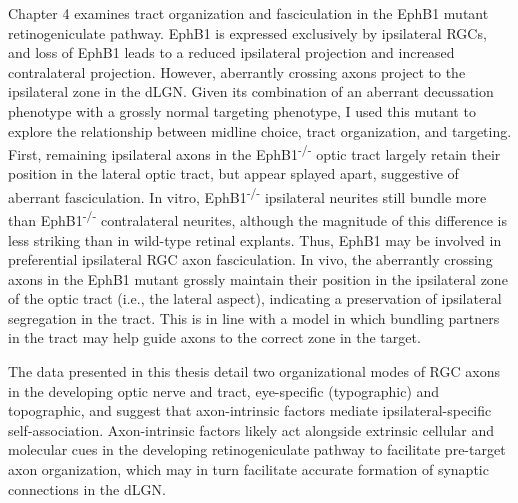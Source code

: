 Chapter 4 examines tract organization and fasciculation in the EphB1 mutant retinogeniculate pathway.
EphB1 is expressed exclusively by ipsilateral RGCs, and loss of EphB1 leads to a reduced ipsilateral projection and increased contralateral projection.
However, aberrantly crossing axons project to the ipsilateral zone in the dLGN.
Given its combination of an aberrant decussation phenotype with a grossly normal targeting phenotype, I used this mutant to explore the relationship between midline choice, tract organization, and targeting.
First, remaining ipsilateral axons in the EphB1\textsuperscript{-/-} optic tract largely retain their position in the lateral optic tract, but appear splayed apart, suggestive of aberrant fasciculation.
In vitro, EphB1\textsuperscript{-/-} ipsilateral neurites still bundle more than EphB1\textsuperscript{-/-} contralateral neurites, although the magnitude of this difference is less striking than in wild-type retinal explants.
Thus, EphB1 may be involved in preferential ipsilateral RGC axon fasciculation.
In vivo, the aberrantly crossing axons in the EphB1 mutant grossly maintain their position in the ipsilateral zone of the optic tract (i.e., the lateral aspect), indicating a preservation of ipsilateral segregation in the tract.
This is in line with a model in which bundling partners in the tract may help guide axons to the correct zone in the target.

The data presented in this thesis detail two organizational modes of RGC axons in the developing optic nerve and tract, eye-specific (typographic) and topographic, and suggest that axon-intrinsic factors mediate ipsilateral-specific self-association.
Axon-intrinsic factors likely act alongside extrinsic cellular and molecular cues in the developing retinogeniculate pathway to facilitate pre-target axon organization, which may in turn facilitate accurate formation of synaptic connections in the dLGN.